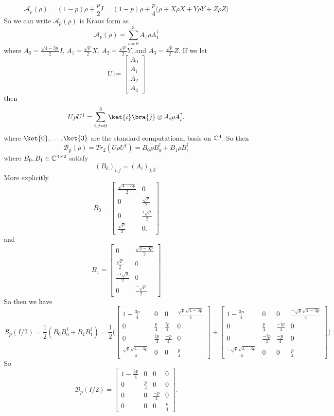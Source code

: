\documentclass[letterpaper,12pt,oneside,onecolumn]{article}
\newcommand{\cA}{\mathcal{A}} \newcommand{\cB}{\mathcal{B}}
\begin{document}
\paragraph{}
$$\cA_p(\rho) = (1-p)\rho + \frac{p}{2}I  = (1-p)\rho + \frac{p}{4}\big( \rho + X\rho X + Y\rho Y + Z \rho Z\big)$$
So we can write $\cA_p(\rho)$ is Kraus form as
$$\cA_p(\rho)= \sum_{i=0}^3 A_1 \rho A_1^\dagger$$
where $A_0 = \frac{\sqrt{4-3p}}{2}I$, $A_1 = \frac{\sqrt{p}}{2}X$, $A_2= \frac{\sqrt{p}}{2}Y$, and $A_3 = \frac{\sqrt{p}}{2}Z$. If we let 
$$U := \begin{bmatrix}
A_0\\ A_1 \\ A_2\\ A_3
\end{bmatrix}$$
then 
$$U\rho U^\dagger = \sum_{i,j=0}^3\ket{i}\bra{j} \otimes A_i\rho A_i^\dagger.$$
where $\ket{0}, \dots, \ket{3}$ are the standard computational basis on $\mathbb{C}^4$. So then
$$\cB_p(\rho) = Tr_2(U\rho U^\dagger) = B_0\rho B_0^\dagger + B_1 \rho B_1^\dagger$$
where $B_0, B_1 \in \mathbb{C}^{4\times 2}$ satisfy
$$(B_k)_{i,j} = (A_i)_{j,k}.$$
More explicitly
$$B_0 = \begin{bmatrix}
\frac{\sqrt{4-3p}}{2} & 0 \\
0 & \frac{\sqrt{p}}{2} \\
0 & \frac{i\sqrt{p}}{2} \\
\frac{\sqrt{p}}{2} & 0.
\end{bmatrix}$$
and
$$B_1 = \begin{bmatrix}
0 & \frac{\sqrt{4-3p}}{2} \\
\frac{\sqrt{p}}{2} & 0 \\
\frac{-i\sqrt{p}}{2} & 0 \\
0 & \frac{-\sqrt{p}}{2}
\end{bmatrix}$$
So then we have
$$\cB_p(I/2) = \frac{1}{2}(B_0 B_0^\dagger + B_1 B_1^\dagger) = \frac{1}{2}\big(\begin{bmatrix}
1-\frac{3p}{4} & 0 & 0 & \frac{\sqrt{p}\sqrt{4-3p}}{4} \\
0 & \frac{p}{4} & \frac{ip}{4} & 0 \\
0 & \frac{ip}{4} & \frac{-p}{4} & 0 \\
 \frac{\sqrt{p}\sqrt{4-3p}}{4} & 0 & 0 & \frac{p}{4}
\end{bmatrix} + \begin{bmatrix}
1-\frac{3p}{4} & 0 & 0 & \frac{-\sqrt{p}\sqrt{4-3p}}{4} \\
0 &  \frac{p}{4} & \frac{-ip}{4} & 0 \\
0 & \frac{-ip}{4} & \frac{-p}{4} & 0 \\
\frac{-\sqrt{p}\sqrt{4-3p}}{4} & 0 & 0 & \frac{p}{4}
\end{bmatrix}\big)$$
So
$$\cB_p(I/2) = \begin{bmatrix}
1-\frac{3p}{4} & 0 & 0 & 0 \\
0 & \frac{p}{4} & 0 & 0 \\
0 & 0 & \frac{-p}{4} & 0 \\
0 & 0 & 0 & \frac{p}{4}
\end{bmatrix}.$$
\end{document}
